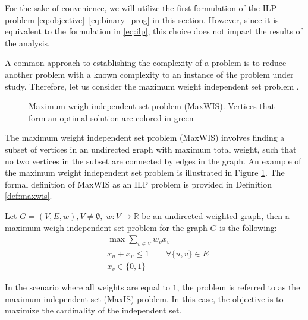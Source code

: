 For the sake of convenience, we will utilize the first formulation of the ILP
problem \eqref{eq:objective}--\eqref{eq:binary_prog} in this section. However,
since it is equivalent to the formulation in \eqref{eq:ilp}, this choice does not
impact the results of the analysis.

A common approach to establishing the complexity of a problem is to reduce another
problem with a known complexity to an instance of the problem under study.
Therefore, let us consider the maximum weight independent set problem
\cite{pemmaraju2003computational}.

\begin{figure}[ht]
  \centering
  \caption{Maximum weigh independent set problem (MaxWIS). Vertices that form an optimal solution are colored in green}
  \label{fig:maxwis}
\end{figure}

The maximum weight independent set problem (MaxWIS) involves finding a subset of
vertices in an undirected graph with maximum total weight, such that no two vertices in
the subset are connected by edges in the graph. An example of the maximum weight
independent set problem is illustrated in Figure \ref{fig:maxwis}.
The formal definition of MaxWIS as an ILP problem is provided in Definition \ref{def:maxwis}.
\begin{definition}[MaxWIS] \label{def:maxwis}
  Let \( G=(V, E, w), V \neq \emptyset, \; w: V \rightarrow \mathbb{R} \) be an undirected weighted graph, then a maximum weigh
  independent set problem for the graph \( G \) is the following:
  \begin{align*}
    & \max \sum\limits_{v \in V} w_v x_v                               \\
    & x_u + x_v \leq 1               \qquad \forall \{u, v\} \in E \\
    & x_v \in \{0, 1\}
  \end{align*}
\end{definition}

In the scenario where all weights are equal to \( 1 \), the problem is referred to as
the maximum independent set (MaxIS) problem. In this case, the objective is to maximize
the cardinality of the independent set.

